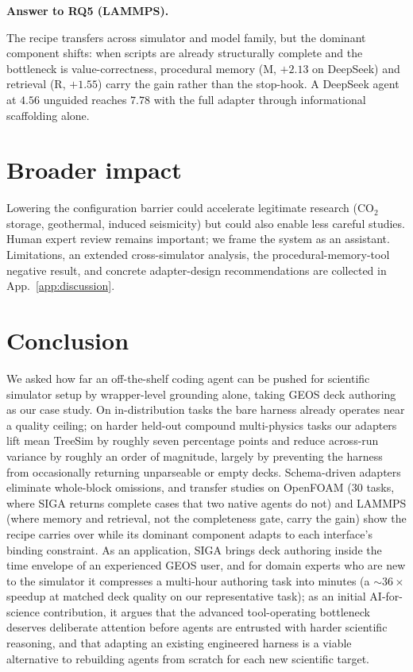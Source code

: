 \documentclass{article}
\newif\ifrqfancy
\newenvironment{rqanswer}[1]{%
  \ifrqfancy\begin{rqbox}\fi\noindent\textbf{Answer to #1.}\ %
}{%
  \ifrqfancy\end{rqbox}\else\par\smallskip\fi%
}
\begin{document}
\begin{rqanswer}{RQ5 (LAMMPS)}
The recipe transfers across simulator and model family, but the dominant component shifts: when scripts are already structurally complete and the bottleneck is value-correctness, procedural memory ($\mathrm{M}$, $+2.13$ on DeepSeek) and retrieval ($\mathrm{R}$, $+1.55$) carry the gain rather than the stop-hook. A DeepSeek agent at $4.56$ unguided reaches $7.78$ with the full adapter through informational scaffolding alone.
\end{rqanswer}


\section{Broader impact}
\label{sec:discussion}
\label{sec:analysis}

Lowering the configuration barrier could accelerate legitimate research (CO$_2$ storage, geothermal, induced seismicity) but could also enable less careful studies. Human expert review remains important; we frame the system as an assistant. Limitations, an extended cross-simulator analysis, the procedural-memory-tool negative result, and concrete adapter-design recommendations are collected in App.~\ref{app:discussion}.


\section{Conclusion}
\label{sec:conclusion}

We asked how far an off-the-shelf coding agent can be pushed for scientific simulator setup by wrapper-level grounding alone, taking GEOS deck authoring as our case study. On in-distribution tasks the bare harness already operates near a quality ceiling; on harder held-out compound multi-physics tasks our adapters lift mean TreeSim by roughly seven percentage points and reduce across-run variance by roughly an order of magnitude, largely by preventing the harness from occasionally returning unparseable or empty decks. Schema-driven adapters eliminate whole-block omissions, and transfer studies on OpenFOAM (30 tasks, where SIGA returns complete cases that two native agents do not) and LAMMPS (where memory and retrieval, not the completeness gate, carry the gain) show the recipe carries over while its dominant component adapts to each interface's binding constraint. As an application, SIGA brings deck authoring inside the time envelope of an experienced GEOS user, and for domain experts who are new to the simulator it compresses a multi-hour authoring task into minutes (a ${\sim}36\times$ speedup at matched deck quality on our representative task); as an initial AI-for-science contribution, it argues that the advanced tool-operating bottleneck deserves deliberate attention before agents are entrusted with harder scientific reasoning, and that adapting an existing engineered harness is a viable alternative to rebuilding agents from scratch for each new scientific target.
\end{document}
